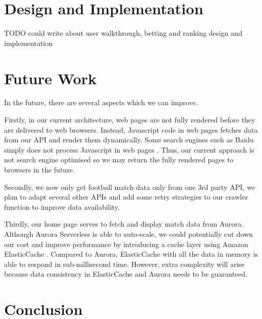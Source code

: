 \documentclass[conference]{IEEEtran}
\begin{document}
\section{Design and Implementation}
TODO could write about user walkthrough, betting and ranking design and implementation

\section{Future Work}
In the future, there are several aspects which we can improve.

Firstly, in our current architecture, web pages are not fully rendered before they are delivered to web browsers. Instead, Javascript code in web pages fetches data from our API and render them dynamically. Some search engines such as Baidu simply does not process Javascript in web pages \cite{b17}. Thus, our current approach is not search engine optimised so we may return the fully rendered pages to browsers in the future.

Secondly, we now only get football match data only from one 3rd party API, we plan to adapt several other APIs and add some retry strategies to our crawler function to improve data availability.

Thirdly, our home page serves to fetch and display match data from Aurora. Although Aurora Serverless is able to auto-scale, we could potentially cut down our cost and improve performance by introducing a cache layer using Amazon ElasticCache \cite{b18}. Compared to Aurora, ElasticCache with all the data in memory is able to respond in sub-millisecond time. However, extra complexity will arise because data consistency in ElasticCache and Aurora needs to be guaranteed.

\section{Conclusion}
\end{document}
